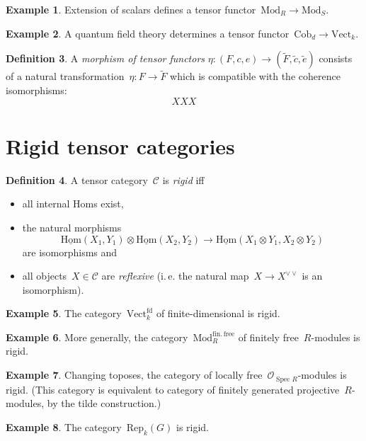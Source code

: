 \documentclass[a4paper,english,12pt]{scrartcl}
\theoremstyle{definition}
\newtheorem{defn}{Definition}[section]
\newtheorem{ex}[defn]{Example}
\theoremstyle{plain}
\theoremstyle{remark}
\renewcommand{\O}{\mathcal{O}}
\newcommand{\C}{\mathcal{C}}
\DeclareMathOperator{\Spec}{Spec}
\renewcommand{\_}{\mathpunct{.}\,}
\newcommand{\?}{\,{:}\,}
\newcommand{\Mod}{\mathrm{Mod}}
\newcommand{\Vect}{\mathrm{Vect}}
\newcommand{\Hom}{\underline{\mathrm{Hom}}}
\newcommand{\Rep}{\mathrm{Rep}}
\newcommand{\Cob}{\mathrm{Cob}}
\begin{document}
\begin{ex}Extension of scalars defines a tensor functor~$\Mod_R \to
\Mod_S$.\end{ex}

\begin{ex}A quantum field theory determines a tensor functor~$\Cob_d \to
\Vect_k$.\end{ex}

\begin{defn}A \emph{morphism of tensor functors} $\eta : (F,c,e) \to
(\tilde F,\tilde c,\tilde e)$ consists of a natural transformation~$\eta : F \to
\tilde F$ which is compatible with the coherence isomorphisms:
\[ XXX \]
\end{defn}


\section{Rigid tensor categories}

\begin{defn}A tensor category~$\C$ is \emph{rigid} iff
\begin{itemize}
\item all internal Homs exist,
\item the natural morphisms
\[ \Hom(X_1,Y_1) \otimes \Hom(X_2,Y_2) \longrightarrow
  \Hom(X_1 \otimes Y_1, X_2 \otimes Y_2) \]
are isomorphisms and
\item all objects~$X \in \C$ are \emph{reflexive} (i.\,e. the natural map~$X
\to X^{\vee\vee}$ is an isomorphism).
\end{itemize}
\end{defn}

\begin{ex}The category~$\Vect^\mathrm{fd}_k$ of finite-dimensional is
rigid.\end{ex}

\begin{ex}More
generally, the category~$\Mod^\mathrm{fin.\,free}_R$ of finitely free~$R$-modules
is rigid.\end{ex}

\begin{ex}Changing toposes, the category of locally free~$\O_{\Spec R}$-modules
is rigid. (This category is equivalent to category of finitely generated
projective~$R$-modules, by the tilde construction.)\end{ex}

\begin{ex}The category~$\Rep_k(G)$ is rigid.\end{ex}
\end{document}
